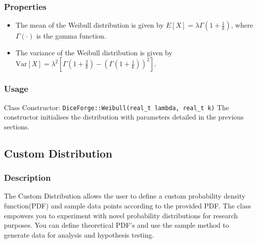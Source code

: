\documentclass[titlepage, 11pt]{article}
\newcommand{\code}[1]
{\colorbox{light-gray}{\texttt{#1}}}
\begin{document}
\subsubsection{Properties}
\begin{itemize}
    \item The mean of the Weibull distribution is given by $E[X] = \lambda \Gamma\left(1 + \frac{1}{k}\right)$, where $\Gamma(\cdot)$ is the gamma function.
    \item The variance of the Weibull distribution is given by $\text{Var}[X] = \lambda^2 \left[\Gamma\left(1 + \frac{2}{k}\right) - \left(\Gamma\left(1 + \frac{1}{k}\right)\right)^2\right]$.
\end{itemize}

\subsubsection{Usage}
Class Constructor:\newline
\code{DiceForge::Weibull(real\_t lambda, real\_t k)}\newline
The constructor initialises the distribution with parameters detailed in the previous sections.\newline

\subsection{Custom Distribution}
\subsubsection{Description}
The Custom Distribution allows the user to define a custom probability density function(PDF) and sample data points according to the provided PDF.
The class empowers you to experiment with novel probability distributions for research purposes. You can define theoretical PDF's and use the sample method to generate data for analysis and hypothesis testing. 
\end{document}
